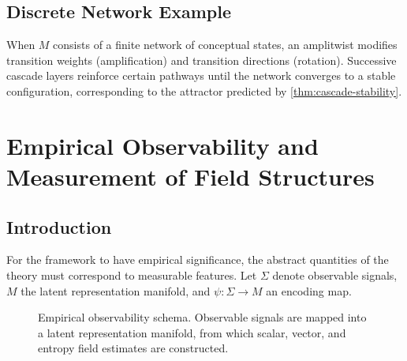 \documentclass[12pt,a4paper,oneside]{book}
\numberwithin{equation}{chapter}
\theoremstyle{plain}
\theoremstyle{definition}
\theoremstyle{remark}
\begin{document}
\section{Discrete Network Example}

When $M$ consists of a finite network of conceptual states, an
amplitwist modifies transition weights (amplification) and transition
directions (rotation). Successive cascade layers reinforce certain
pathways until the network converges to a stable configuration,
corresponding to the attractor predicted by
\cref{thm:cascade-stability}.


\chapter[Empirical Observability]{Empirical Observability and Measurement of Field Structures}
\label{ch:observability}

\section{Introduction}

For the framework to have empirical significance, the abstract
quantities of the theory must correspond to measurable features.
Let $\Sigma$ denote observable signals, $M$ the latent
representation manifold, and $\psi : \Sigma \rightarrow M$ an
encoding map.

\begin{figure}[htbp]
\centering
{}
\caption{Empirical observability schema. Observable signals are
mapped into a latent representation manifold, from which scalar,
vector, and entropy field estimates are constructed.}
\label{fig:observability-schema}
\end{figure}
\end{document}
